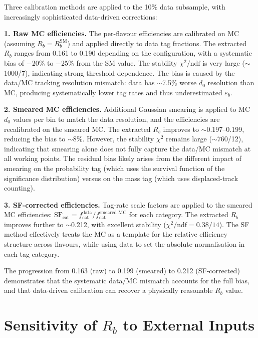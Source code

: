 \documentclass[11pt,a4paper]{article}
\begin{document}
Three calibration methods are applied to the 10\% data subsample,
with increasingly sophisticated data-driven corrections:

\textbf{1. Raw MC efficiencies.}
The per-flavour efficiencies are calibrated on MC (assuming
$R_b = R_b^\text{SM}$) and applied directly to data tag fractions.
The extracted $R_b$ ranges from 0.161 to 0.190 depending on the
configuration, with a systematic bias of $-$20\% to $-$25\% from
the SM value.
The stability $\chi^2/\text{ndf}$ is very large ($\sim$1000/7),
indicating strong threshold dependence.
The bias is caused by the data/MC tracking resolution mismatch:
data has $\sim$7.5\% worse $d_0$ resolution than MC, producing
systematically lower tag rates and thus underestimated
$\varepsilon_b$.

\textbf{2. Smeared MC efficiencies.}
Additional Gaussian smearing is applied to MC $d_0$ values
per bin to match the data resolution, and the efficiencies are
recalibrated on the smeared MC.
The extracted $R_b$ improves to $\sim$0.197--0.199, reducing the
bias to $\sim$8\%.
However, the stability $\chi^2$ remains large ($\sim$760/12),
indicating that smearing alone does not fully capture the data/MC
mismatch at all working points.
The residual bias likely arises from the different impact of
smearing on the probability tag (which uses the survival function
of the significance distribution) versus on the mass tag (which
uses displaced-track counting).

\textbf{3. SF-corrected efficiencies.}
Tag-rate scale factors are applied to the smeared MC efficiencies:
$\text{SF}_\text{cat} = f_\text{cat}^\text{data} /
f_\text{cat}^\text{smeared MC}$ for each category.
The extracted $R_b$ improves further to $\sim$0.212, with
excellent stability ($\chi^2/\text{ndf} = 0.38/14$).
The SF method effectively treats the MC as a template for the
relative efficiency structure across flavours, while using data to
set the absolute normalisation in each tag category.

The progression from 0.163 (raw) to 0.199 (smeared) to 0.212
(SF-corrected) demonstrates that the systematic data/MC mismatch
accounts for the full bias, and that data-driven calibration can
recover a physically reasonable $R_b$ value.

\section{Sensitivity of $R_b$ to External Inputs}
\label{app:sensitivity}
\end{document}
